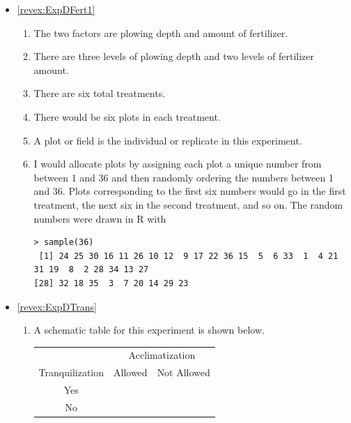 \documentclass[10pt,openany]{book}\usepackage[]{graphicx}\usepackage[]{color}
\makeatletter
\newenvironment{kframe}{%
 \def\at@end@of@kframe{}%
 \ifinner\ifhmode%
  \def\at@end@of@kframe{\end{minipage}}%
  \begin{minipage}{\columnwidth}%
 \fi\fi%
 \def\FrameCommand##1{\hskip\@totalleftmargin \hskip-\fboxsep
 \colorbox{shadecolor}{##1}\hskip-\fboxsep
     \hskip-\linewidth \hskip-\@totalleftmargin \hskip\columnwidth}%
 \MakeFramed {\advance\hsize-\width
   \@totalleftmargin\z@ \linewidth\hsize
   \@setminipage}}%
 {\par\unskip\endMakeFramed%
 \at@end@of@kframe}
\newenvironment{knitrout}{}{} %
\makeatother
\begin{document}
\begin{itemize}
  \item \hypertarget{ans:ExpDFert1}{\ref{revex:ExpDFert1}}
    \begin{enumerate}
      \item The two factors are plowing depth and amount of fertilizer.
      \item There are three levels of plowing depth and two levels of fertilizer amount.
      \item There are six total treatments.
      \item There would be six plots in each treatment.
      \item A plot or field is the individual or replicate in this experiment.
      \item I would allocate plots by assigning each plot a unique number from between 1 and 36 and then randomly ordering the numbers between 1 and 36.  Plots corresponding to the first six numbers would go in the first treatment, the next six in the second treatment, and so on.  The random numbers were drawn in R with
\begin{knitrout}
\color{fgcolor}\begin{kframe}
\begin{verbatim}
> sample(36)
 [1] 24 25 30 16 11 26 10 12  9 17 22 36 15  5  6 33  1  4 21 31 19  8  2 28 34 13 27
[28] 32 18 35  3  7 20 14 29 23
\end{verbatim}
\end{kframe}
\end{knitrout}
    \end{enumerate}

  \item \hypertarget{ans:ExpDTrans}{\ref{revex:ExpDTrans}}
    \begin{enumerate}
      \item A schematic table for this experiment is shown below.

\begin{tabular}{cc|c|}
 & \multicolumn{2}{c}{Acclimatization} \\
\cline{2-3}
\multicolumn{1}{c|}{Tranquilization} & Allowed & Not Allowed \\
\hline
\multicolumn{1}{c|}{Yes} &  & \multicolumn{1}{c|}{} \\
\hline
\multicolumn{1}{c|}{No} &  &  \multicolumn{1}{c|}{} \\
\cline{2-3}
\end{tabular}


\end{enumerate}
\end{itemize}
\end{document}
